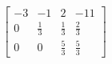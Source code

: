 \documentclass[preview]{standalone}
\begin{document}
\begin{align*}
\left[\begin{array}{ccc|c}-3 & -1 & 2 & -11 \\0 & \frac{1}{3} & \frac{1}{3} & \frac{2}{3} \\0 & 0 & \frac{5}{3} & \frac{5}{3}\end{array}\right]
\end{align*}
\end{document}
